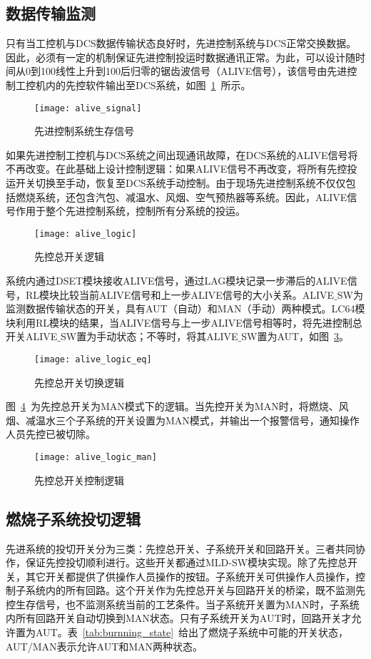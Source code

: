 \subsection{数据传输监测}

只有当工控机与DCS数据传输状态良好时，先进控制系统与DCS正常交换数据。因此，必须有一定的机制保证先进控制投运时数据通讯正常。为此，可以设计随时间从0到100线性上升到100后归零的锯齿波信号（ALIVE信号），该信号由先进控制工控机内的先控软件输出至DCS系统，如图~\ref{fig:alive_signal}~所示。
\begin{figure}[!hbt]
\centering
\texttt{[image: alive\_signal]}
\caption{先进控制系统生存信号} \label{fig:alive_signal}
\end{figure}

如果先进控制工控机与DCS系统之间出现通讯故障，在DCS系统的ALIVE信号将不再改变。在此基础上设计控制逻辑：如果ALIVE信号不再改变，将所有先控投运开关切换至手动，恢复至DCS系统手动控制。由于现场先进控制系统不仅仅包括燃烧系统，还包含汽包、减温水、风烟、空气预热器等系统。因此，ALIVE信号作用于整个先进控制系统，控制所有分系统的投运。
\begin{figure}[!hbt]
\centering
\texttt{[image: alive\_logic]}
\caption{先控总开关逻辑} \label{fig:alive_logic}
\end{figure}

系统内通过DSET模块接收ALIVE信号，通过LAG模块记录一步滞后的ALIVE信号，RL模块比较当前ALIVE信号和上一步ALIVE信号的大小关系。ALIVE$\_$SW为监测数据传输状态的开关，具有AUT（自动）和MAN（手动）两种模式。LC64模块利用RL模块的结果，当ALIVE信号与上一步ALIVE信号相等时，将先进控制总开关ALIVE$\_$SW置为手动状态；不等时，将其ALIVE$\_$SW置为AUT，如图~\ref{fig:alive_logic_eq}。
\begin{figure}[!hbt]
\centering
\texttt{[image: alive\_logic\_eq]}
\caption{先控总开关切换逻辑} \label{fig:alive_logic_eq}
\end{figure}

 
图~\ref{fig:alive_logic_man}~为先控总开关为MAN模式下的逻辑。当先控开关为MAN时，将燃烧、风烟、减温水三个子系统的开关设置为MAN模式，并输出一个报警信号，通知操作人员先控已被切除。
\begin{figure}[!hbt]
\centering
\texttt{[image: alive\_logic\_man]}
\caption{先控总开关控制逻辑} \label{fig:alive_logic_man}
\end{figure}

 
\subsection{燃烧子系统投切逻辑}
先进系统的投切开关分为三类：先控总开关、子系统开关和回路开关。三者共同协作，保证先控投切顺利进行。这些开关都通过MLD-SW模块实现。除了先控总开关，其它开关都提供了供操作人员操作的按钮。子系统开关可供操作人员操作，控制子系统内的所有回路。这个开关作为先控总开关与回路开关的桥梁，既不监测先控生存信号，也不监测系统当前的工艺条件。当子系统开关置为MAN时，子系统内所有回路开关自动切换到MAN状态。只有子系统开关为AUT时，回路开关才允许置为AUT。表~\ref{tab:burnning_state}~给出了燃烧子系统中可能的开关状态，AUT/MAN表示允许AUT和MAN两种状态。

